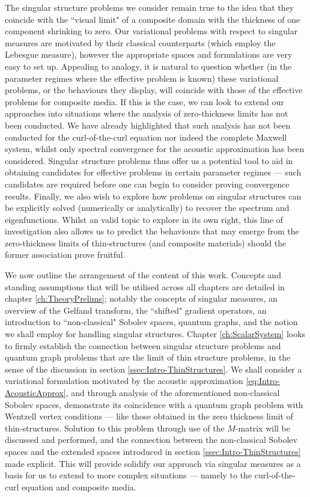 The singular structure problems we consider remain true to the idea that they coincide with the ``visual limit" of a composite domain with the thickness of one component shrinking to zero.
Our variational problems with respect to singular measures are motivated by their classical counterparts (which employ the Lebesgue measure), however the appropriate spaces and formulations are very easy to set up.
Appealing to analogy, it is natural to question whether (in the parameter regimes where the effective problem is known) these variational problems, or the behaviours they display, will coincide with those of the effective problems for composite media.
If this is the case, we can look to extend our approaches into situations where the analysis of zero-thickness limits has not been conducted.
We have already highlighted that such analysis has not been conducted for the curl-of-the-curl equation nor indeed the complete Maxwell system, whilst only spectral convergence for the acoustic approximation has been considered.
Singular structure problems thus offer us a potential tool to aid in obtaining candidates for effective problems in certain parameter regimes --- such candidates are required before one can begin to consider proving convergence results.
Finally, we also wish to explore how problems on singular structures can be explicitly solved (numerically or analytically) to recover the spectrum and eigenfunctions.
Whilst an valid topic to explore in its own right, this line of investigation also allows us to predict the behaviours that may emerge from the zero-thickness limits of thin-structures (and composite materials) should the former association prove fruitful.

We now outline the arrangement of the content of this work.
Concepts and standing assumptions that will be utilised across all chapters are detailed in chapter \ref{ch:TheoryPrelims}; notably the concepts of singular measures, an overview of the Gelfand transform, the ``shifted" gradient operators, an introduction to ``non-classical" Sobolev spaces, quantum graphs, and the notion we shall employ for handling singular structures.
Chapter \ref{ch:ScalarSystem} looks to firmly establish the connection between singular structure problems and quantum graph problems that are the limit of thin structure problems, in the sense of the discussion in section \ref{ssec:Intro-ThinStructures}.
We shall consider a variational formulation motivated by the acoustic approximation \eqref{eq:Intro-AcousticApprox}, and through analysis of the aforementioned non-classical Sobolev spaces, demonstrate its coincidence with a quantum graph problem with Wentzell vertex conditions --- like those obtained in the zero thickness limit of thin-structures.
Solution to this problem through use of the $M$-matrix will be discussed and performed, and the connection between the non-classical Sobolev spaces and the extended spaces introduced in section \ref{ssec:Intro-ThinStructures} made explicit.
This will provide solidify our approach via singular measures as a basis for us to extend to more complex situations --- namely to the curl-of-the-curl equation and composite media.

